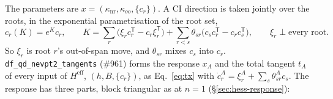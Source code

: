 \documentclass[11pt]{article}
\newcommand{\code}[1]{\texttt{#1}}
\newcommand{\Heff}{H^{\mathrm{eff}}}
\newcommand{\T}{\mathsf T}
\begin{document}
The parameters are $x = (\kappa_{\mathrm{nr}}, \kappa_{oo}, \{c_r\})$. A CI
direction is taken jointly over the roots, in the exponential
parametrisation of the root set,
\begin{equation}
  c_r(K) = e^{K}c_r,\qquad
  K = \sum_r\bigl(\xi_r c_r^\T - c_r\xi_r^\T\bigr)
    + \sum_{r<s}\theta_{sr}\bigl(c_sc_r^\T - c_rc_s^\T\bigr),
  \qquad \xi_r\perp\text{every root}.
  \label{eq:qd-K}
\end{equation}
So $\xi_r$ is root $r$'s out-of-span move, and $\theta_{sr}$ mixes $c_s$
into $c_r$. \code{df\_qd\_nevpt2\_tangents} (\#961) forms the response $x_A$
and the total tangent $t_A$ of every input of $\Heff$,
$(h, B, \{c_r\})$, as Eq.~\eqref{eq:tx} with $\dot c^A_r = \xi^A_r +
\sum_s\theta^A_{sr}c_s$. The response has three parts, block triangular as
at $n = 1$ (\S\ref{sec:hess-response}):
\end{document}
